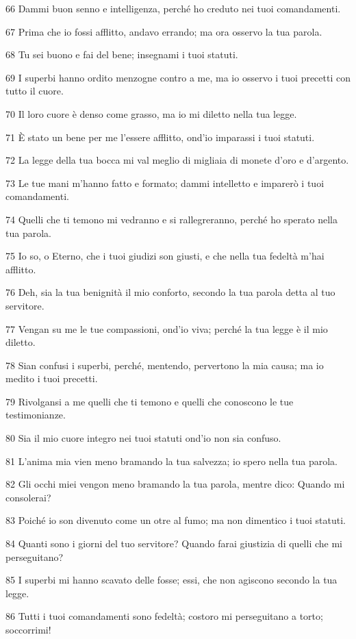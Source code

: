 \par 66 Dammi buon senno e intelligenza, perché ho creduto nei tuoi comandamenti.
\par 67 Prima che io fossi afflitto, andavo errando; ma ora osservo la tua parola.
\par 68 Tu sei buono e fai del bene; insegnami i tuoi statuti.
\par 69 I superbi hanno ordito menzogne contro a me, ma io osservo i tuoi precetti con tutto il cuore.
\par 70 Il loro cuore è denso come grasso, ma io mi diletto nella tua legge.
\par 71 È stato un bene per me l'essere afflitto, ond'io imparassi i tuoi statuti.
\par 72 La legge della tua bocca mi val meglio di migliaia di monete d'oro e d'argento.
\par 73 Le tue mani m'hanno fatto e formato; dammi intelletto e imparerò i tuoi comandamenti.
\par 74 Quelli che ti temono mi vedranno e si rallegreranno, perché ho sperato nella tua parola.
\par 75 Io so, o Eterno, che i tuoi giudizi son giusti, e che nella tua fedeltà m'hai afflitto.
\par 76 Deh, sia la tua benignità il mio conforto, secondo la tua parola detta al tuo servitore.
\par 77 Vengan su me le tue compassioni, ond'io viva; perché la tua legge è il mio diletto.
\par 78 Sian confusi i superbi, perché, mentendo, pervertono la mia causa; ma io medito i tuoi precetti.
\par 79 Rivolgansi a me quelli che ti temono e quelli che conoscono le tue testimonianze.
\par 80 Sia il mio cuore integro nei tuoi statuti ond'io non sia confuso.
\par 81 L'anima mia vien meno bramando la tua salvezza; io spero nella tua parola.
\par 82 Gli occhi miei vengon meno bramando la tua parola, mentre dico: Quando mi consolerai?
\par 83 Poiché io son divenuto come un otre al fumo; ma non dimentico i tuoi statuti.
\par 84 Quanti sono i giorni del tuo servitore? Quando farai giustizia di quelli che mi perseguitano?
\par 85 I superbi mi hanno scavato delle fosse; essi, che non agiscono secondo la tua legge.
\par 86 Tutti i tuoi comandamenti sono fedeltà; costoro mi perseguitano a torto; soccorrimi!
